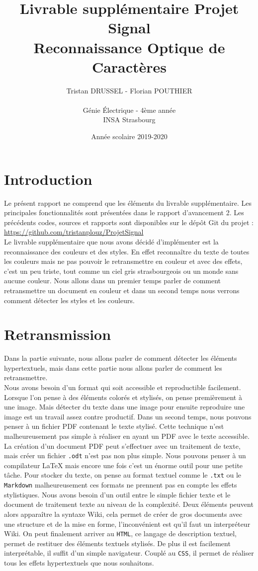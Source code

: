 \documentclass[a4paper,12pt,titlepage]{report}
\title{Livrable supplémentaire Projet Signal\\Reconnaissance Optique de Caractères}
\author{Tristan DRUSSEL - Florian POUTHIER \\ \\ Génie Électrique - 4ème année\\ INSA Strasbourg}
\date{Année scolaire 2019-2020}
\begin{document}
	\begin{titlepage}
		\maketitle
	\end{titlepage}
	\tableofcontents
	\newpage
	\section{Introduction}
	Le présent rapport ne comprend que les éléments du livrable supplémentaire. Les principales fonctionnalités sont présentées dans le rapport d'avancement 2. Les précédents codes, sources et rapports sont disponibles sur le dépôt Git du projet : \url{https://github.com/tristanplouz/ProjetSignal} \\
	Le livrable supplémentaire que nous avons décidé d'implémenter est la reconnaissance des couleurs et des styles. En effet reconnaître du texte de toutes les couleurs mais ne pas pouvoir le retransmettre en couleur et avec des effets, c'est un peu triste, tout comme un ciel gris strasbourgeois ou un monde sans aucune couleur.
	Nous allons dans un premier temps parler de comment retransmettre un document en couleur et dans un second temps nous verrons comment détecter les styles et les couleurs.
	\section{Retransmission}
	Dans la partie suivante, nous allons parler de comment détecter les éléments hypertextuels, mais dans cette partie nous allons parler de comment les retransmettre.\\
	Nous avons besoin d'un format qui soit accessible et reproductible facilement. Lorsque l'on pense à des éléments colorés et stylisés, on pense premièrement à une image. Mais détecter du texte dans une image pour ensuite reproduire une image est un travail assez contre productif. Dans un second temps, nous pouvons penser à un fichier PDF contenant le texte stylisé. Cette technique n'est malheureusement pas simple à réaliser en ayant un PDF avec le texte accessible. La création d'un document PDF peut s'effectuer avec un traitement de texte, mais créer un fichier \texttt{.odt} n'est pas non plus simple. Nous pouvons penser à un compilateur \LaTeX{} mais encore une fois c'est un énorme outil pour une petite tâche. Pour stocker du texte, on pense au format textuel comme le \texttt{.txt} ou le \texttt{Markdown} malheureusement ces formats ne prennent pas en compte les effets stylistiques. Nous avons besoin d'un outil entre le simple fichier texte et le document de traitement texte au niveau de la complexité. Deux éléments peuvent alors apparaître la syntaxe Wiki, cela permet de créer de gros documents avec une structure et de la mise en forme, l'inconvénient est qu'il faut un interpréteur Wiki. On peut finalement arriver au \texttt{HTML}, ce langage de description textuel, permet de restituer des éléments textuels stylisés. De plus il est facilement interprétable, il suffit d'un simple navigateur. Couplé au \texttt{CSS}, il permet de réaliser tous les effets hypertextuels que nous souhaitons.
\end{document}
